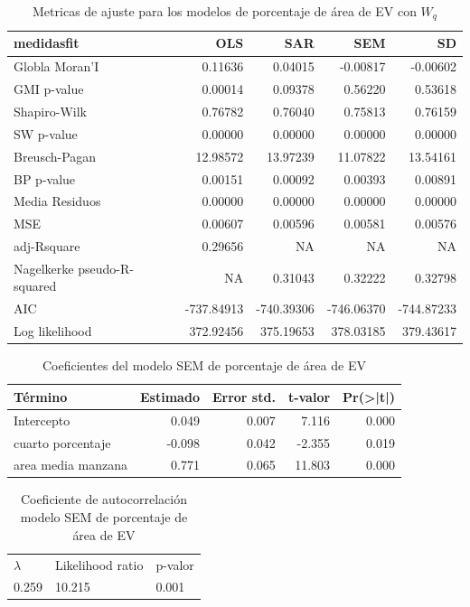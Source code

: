 \documentclass[12pt,a4paper,openany]{book}
\theoremstyle{definition}
\theoremstyle{definition}
\theoremstyle{definition}
\theoremstyle{remark}
\begin{document}
\begin{table}[t]

\caption{\label{tab:tabla-comp-modelos-areaep}Metricas de ajuste para los modelos de porcentaje de área de EV con $W_q$}
\centering
\begin{tabular}{lrrrr}
\toprule
medidasfit & OLS & SAR & SEM & SD\\
\midrule
Globla Moran'I & 0.11636 & 0.04015 & -0.00817 & -0.00602\\
GMI p-value & 0.00014 & 0.09378 & 0.56220 & 0.53618\\
Shapiro-Wilk & 0.76782 & 0.76040 & 0.75813 & 0.76159\\
SW p-value & 0.00000 & 0.00000 & 0.00000 & 0.00000\\
Breusch-Pagan & 12.98572 & 13.97239 & 11.07822 & 13.54161\\
\addlinespace
BP p-value & 0.00151 & 0.00092 & 0.00393 & 0.00891\\
Media Residuos & 0.00000 & 0.00000 & 0.00000 & 0.00000\\
MSE & 0.00607 & 0.00596 & 0.00581 & 0.00576\\
adj-Rsquare & 0.29656 & NA & NA & NA\\
Nagelkerke pseudo-R-squared & NA & 0.31043 & 0.32222 & 0.32798\\
\addlinespace
AIC & -737.84913 & -740.39306 & -746.06370 & -744.87233\\
Log likelihood & 372.92456 & 375.19653 & 378.03185 & 379.43617\\
\bottomrule
\end{tabular}
\end{table}

\begin{table}[t]

\caption{\label{tab:coef-sem-areaep}Coeficientes del modelo SEM de porcentaje de área de EV}
\centering
\begin{tabular}{lrrrr}
\toprule
Término & Estimado & Error std. & t-valor & Pr(>|t|)\\
\midrule
Intercepto & 0.049 & 0.007 & 7.116 & 0.000\\
cuarto porcentaje & -0.098 & 0.042 & -2.355 & 0.019\\
area media manzana & 0.771 & 0.065 & 11.803 & 0.000\\
\bottomrule
\end{tabular}
\end{table}

\begin{table}[t]

\caption{\label{tab:cauto-sem-areaep}Coeficiente de autocorrelación modelo SEM de porcentaje de área de EV}
\centering
\begin{tabular}{lll}
\toprule
$\lambda$ & Likelihood ratio & p-valor\\
0.259 & 10.215 & 0.001\\
\bottomrule
\end{tabular}
\end{table}
\end{document}
